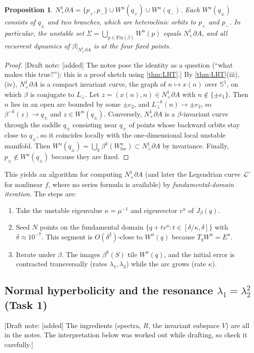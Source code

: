\documentclass[11pt,a4paper]{article}
\newif\ifdraftnotes \draftnotestrue
\newcommand{\note}[1]{\ifdraftnotes{\color{BrickRed}\textsf{\footnotesize[Draft note: #1]}}\fi}
\newtheorem{proposition}[theorem]{Proposition}
\theoremstyle{definition}
\theoremstyle{remark}
\newcommand{\Sph}{\mathbb{S}}
\newcommand{\Nb}{N^1_+\partial A}
\newcommand{\Lperp}{L_\perp}
\begin{document}
\begin{proposition}\label{prop:structure}
$\Nb=\{p_+,p_-\}\cup W^u(q_+)\cup W^u(q_-)$. Each $W^u(q_\pm)$ consists of $q_\pm$ and two branches, which are
heteroclinic orbits to $p_+$ and $p_-$. In particular, the unstable set $\Sigma=\bigcup_{p\in\mathrm{Fix}(\beta)}W^u(p)$
equals $\Nb$, and all recurrent dynamics of $\beta|_{\Nb}$ is at the four fixed points.
\end{proposition}
\begin{proof}\note{[added] The notes pose the identity as a question (``what makes this true?''); this is a proof sketch using \cref{thm:LRT}.}
By \cref{thm:LRT}(iii),(iv), $\Nb$ is a compact invariant curve, the graph of $n\mapsto x(n)$ over $\Sph^1$, on which
$\beta$ is conjugate to $\Lperp$. Let $z=(x(n),n)\in\Nb$ with $n\notin\{\pm e_1\}$. Then $n$ lies in an open arc
bounded by some $\pm e_2$, and $\Lperp^{-k}(n)\to\pm e_2$, so $\beta^{-k}(z)\to q_\pm$ and $z\in W^u(q_\pm)$. Conversely,
$\Nb$ is a $\beta$-invariant curve through the saddle $q_\pm$ consisting near $q_\pm$ of points whose backward orbits stay
close to $q_\pm$, so it coincides locally with the one-dimensional local unstable manifold. Then
$W^u(q_\pm)=\bigcup_k\beta^k(W^u_{\mathrm{loc}})\subset\Nb$ by invariance. Finally, $p_\pm\notin W^u(q_\pm)$ because they are
fixed.
\end{proof}

This yields an algorithm for computing $\Nb$ (and later the Legendrian curve $\mathcal{L}'$ for nonlinear $f$, where no
series formula is available) by \emph{fundamental-domain iteration}. The steps are:
\begin{enumerate}
  \item Take the unstable eigenvalue $\kappa=\mu^{-1}$ and eigenvector $v^u$ of $J_\beta(q)$.
  \item Seed $N$ points on the fundamental domain $\{q+tv^u: t\in[\delta/\kappa,\delta]\}$ with $\delta\approx10^{-7}$. This
  segment is $O(\delta^2)$-close to $W^u(q)$ because $T_qW^u=E^u$.
  \item Iterate under $\beta$. The images $\beta^k(S)$ tile $W^u(q)$, and the initial error is contracted transversally
  (rates $\lambda_1,\lambda_2$) while the arc grows (rate $\kappa$).
\end{enumerate}

\subsection{Normal hyperbolicity and the resonance $\lambda_1=\lambda_2^2$ (Task 1)}\label{sec:NH}
\note{[added] The ingredients (spectra, $R$, the invariant subspace $V$) are all in the notes. The interpretation below was worked out while drafting, so check it carefully.}
\end{document}

